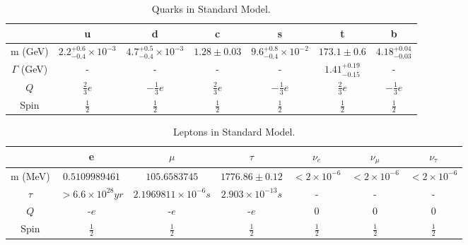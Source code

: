 \documentclass[11pt]{article}
\begin{document}
\begin{table}[htb]
  \centering
  \caption{Quarks in Standard Model.}
  \label{tb:quarks}
  \begin{tabular}{|c|c|c|c|c|c|c|}
  \hline
                  & u                                 & d                                 & c               & s                                 & t                      & b                      \\ \hline
  m (GeV)        & $2.2^{+0.6}_{-0.4}\times 10^{-3}$ & $4.7^{+0.5}_{-0.4}\times 10^{-3}$ & $1.28 \pm 0.03$ & $9.6^{+0.8}_{-0.4}\times 10^{-2}$ & $173.1 \pm 0.6 $       & $4.18^{+0.04}_{-0.03}$ \\ \hline
  $\Gamma$ (GeV) & -                                 & -                                 & -               & -                                 & $1.41^{+0.19}_{-0.15}$ & -                      \\ \hline
  $Q$            & $\frac{2}{3}e$                    & $-\frac{1}{3}e$                   & $\frac{2}{3}e$  & $-\frac{1}{3}e$                   & $\frac{2}{3}e$         & $-\frac{1}{3}e$        \\ \hline
  Spin           & $\frac{1}{2}$                     & $\frac{1}{2}$                     & $\frac{1}{2}$   & $\frac{1}{2}$                     & $\frac{1}{2}$          & $\frac{1}{2}$          \\ \hline
  \end{tabular}
\end{table}


\begin{table}[htb]
  \centering
  \caption{Leptons in Standard Model.}
  \label{tb:lep}
  \begin{tabular}{|c|c|c|c|c|c|c|}
  \hline
          & e                               & $\mu$                                     & $\tau$                          & $\nu_e$            & $\nu_\mu$         & $\nu_\tau$         \\ \hline
  m (MeV) & $0.5109989461$ & $105.6583745$               & $1776.86 \pm 0.12$              & $<2\times 10^{-6}$ & $<2\times10^{-6}$ & $<2\times 10^{-6}$ \\ \hline
  $\tau$  & $>6.6 \times 10^{28} yr$      & $2.1969811 \times 10^{-6} s$ & $2.903 \times 10^{-13} s$ &           -         &         -          &    -                \\ \hline
  $Q$     & -$e$                              & -$e$                                        & -$e$                              & 0                  & 0                 & 0                  \\ \hline
  Spin    & $\frac{1}{2}$                   & $\frac{1}{2}$                             & $\frac{1}{2}$                   & $\frac{1}{2}$      & $\frac{1}{2}$     & $\frac{1}{2}$      \\ \hline
  \end{tabular}
\end{table}
\end{document}
